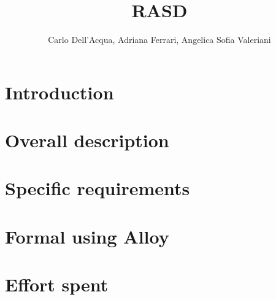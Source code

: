\documentclass{report}
\begin{document}
  \title{RASD}
  \author{Carlo Dell'Acqua, Adriana Ferrari, Angelica Sofia Valeriani}
  \maketitle

  \tableofcontents

  \chapter{Introduction}
  

  \chapter{Overall description}
  

  \chapter{Specific requirements}
  
  
  \chapter{Formal using Alloy}
  

  \chapter{Effort spent}
  

  \begin{thebibliography}{0}
  \end{thebibliography}
\end{document}
